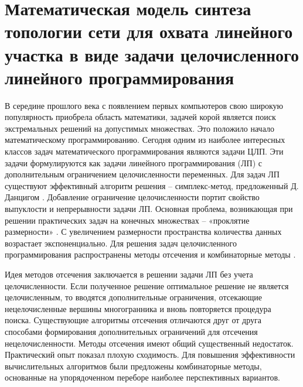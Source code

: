 

\section{Математическая модель синтеза топологии сети для охвата линейного участка в виде задачи целочисленного линейного программирования}

В середине прошлого века с появлением первых компьютеров свою широкую популярность приобрела область математики, задачей корой является поиск экстремальных решений на допустимых множествах. Это положило начало математическому программированию. Сегодня одним из наиболее интересных классов задач математического программирования являются задачи ЦЛП. Эти задачи формулируются как задачи линейного программирования (ЛП) с дополнительным ограничением целочисленности переменных. Для задач ЛП существуют эффективный алгоритм решения -- симплекс-метод, предложенный Д. Данцигом \cite{Dantzig1963}. Добавление ограничение целочисленности портит свойство выпуклости и непрерывности задачи ЛП. Основная проблема, возникающая при решении практических задач на конечных множествах --  «проклятие размерности» \cite{Pershin2013}. С увеличением размерности пространства количества данных возрастает экспоненциально. Для решения задач целочисленного программирования распространены методы отсечения и комбинаторные методы \cite{Alekseev1987, Sukharev1986}. 

Идея методов отсечения заключается в решении задачи ЛП без учета целочисленности. Если полученное решение оптимальное решение не является целочисленным, то вводятся дополнительные ограничения, отсекающие нецелочисленные вершины многогранника и вновь повторяется процедура поиска. Существующие алгоритмы отсечения отличаются друг от друга способами формирования дополнительных ограничений для отсечения нецелочисленности. Методы отсечения имеют общий существенный недостаток. Практический опыт показал плохую сходимость. Для повышения эффективности вычислительных алгоритмов были предложены комбинаторные методы, основанные на упорядоченном переборе наиболее перспективных вариантов. 


